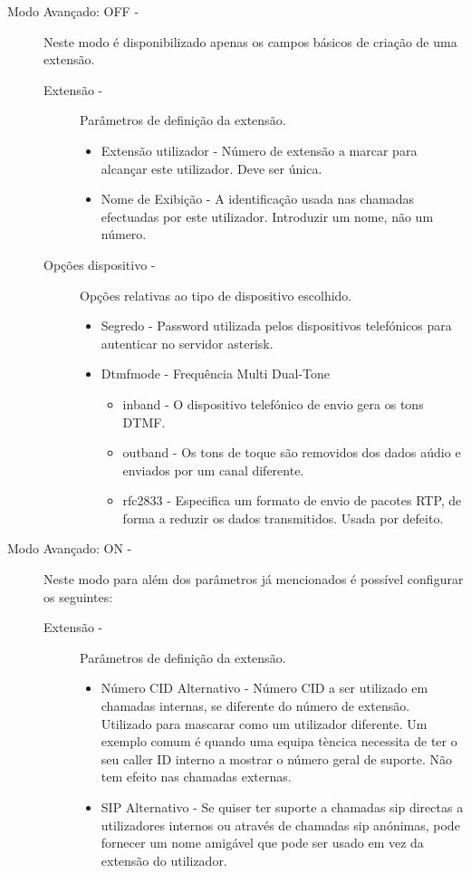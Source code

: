 \begin{description}
	\item[Modo Avançado: OFF -] Neste modo é disponibilizado apenas os campos básicos de criação de uma extensão.
        \begin{description}
            \item[Extensão -] Parâmetros de definição da extensão.
                \begin{itemize}
                    \item Extensão utilizador - Número de extensão a marcar para alcançar este utilizador. Deve ser única.
                    \item Nome de Exibição - A identificação usada nas chamadas efectuadas por este utilizador. Introduzir um nome, não um número.
                \end{itemize}

            \item[Opções dispositivo -] Opções relativas ao tipo de dispositivo escolhido.
                \begin{itemize}
                    \item Segredo - Password utilizada pelos dispositivos telefónicos para autenticar no servidor asterisk.
                    \item Dtmfmode - Frequência Multi Dual-Tone
                        \begin{itemize}
                            \item inband - O dispositivo telefónico de envio gera os tons DTMF.
                            \item outband - Os tons de toque são removidos dos dados aúdio e enviados por um canal diferente.
                            \item rfc2833 - Especifica um formato de envio de pacotes RTP, de forma a reduzir os dados transmitidos. Usada por defeito.
                        \end{itemize}
                \end{itemize}
        \end{description}
	\item[Modo Avançado: ON -] Neste modo para além dos parâmetros já mencionados é possível configurar os seguintes:
        \begin{description}
            \item[Extensão -] Parâmetros de definição da extensão.
                \begin{itemize}
                    \item Número CID Alternativo - Número CID a ser utilizado em chamadas internas, se diferente do número de extensão. Utilizado para mascarar como um utilizador diferente. Um exemplo comum é quando uma equipa tèncica necessita de ter o seu caller ID interno a mostrar o número geral de suporte. Não tem efeito nas chamadas externas.
                    \item SIP Alternativo - Se quiser ter suporte a chamadas sip directas a utilizadores internos ou através de chamadas sip anónimas, pode fornecer um nome amigável que pode ser usado em vez da extensão do utilizador.
                \end{itemize}


\end{description}
\end{description}
